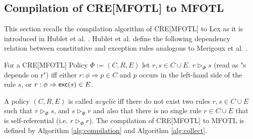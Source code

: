 \subsection{Compilation of CRE[MFOTL] to MFOTL}
\label{section:cre-compilation}
This section recalls the compilation algorithm of CRE[MFOTL] to Lex
as it is introduced in Hublet et al. \cite[Section 3.2]{lex}.
Hublet et al. \cite{lex} define the following dependency relation between
constitutive and exception rules analogous to
Merigoux et al. \cite[Section 4.1]{merigoux_catala_2021}.

\begin{definition}
    \label{def:cre-dependency-relation}
    For a CRE[MFOTL] Policy $\Phi := (C,R,E)$ let $r,s \in C \cup E$.
    $r \triangleright_\Phi s$ (read as "s depends on r")
    iff either $r:\phi \Rightarrow p \in C$ and $p$ occurs in the
    left-hand side of the rule $s$, or
    $r:\phi \Rightarrow \mathsf{exc}(s) \in E$.
\end{definition}

A policy $(C,R,E)$ is called \emph{acyclic} iff there do not exist two 
rules $r,s \in C \cup E$ such that $r \triangleright_\Phi s$,
and $s \triangleright_\Phi r$ and also that there is no single rule $r \in C \cup E$
that is self-referential (i.e. $r \triangleright_\Phi r$).
The compilation of CRE[MFOTL] to MFOTL is defined by Algorithm 
\ref{alg:compilation} and Algorithm \ref{alg:collect}.

